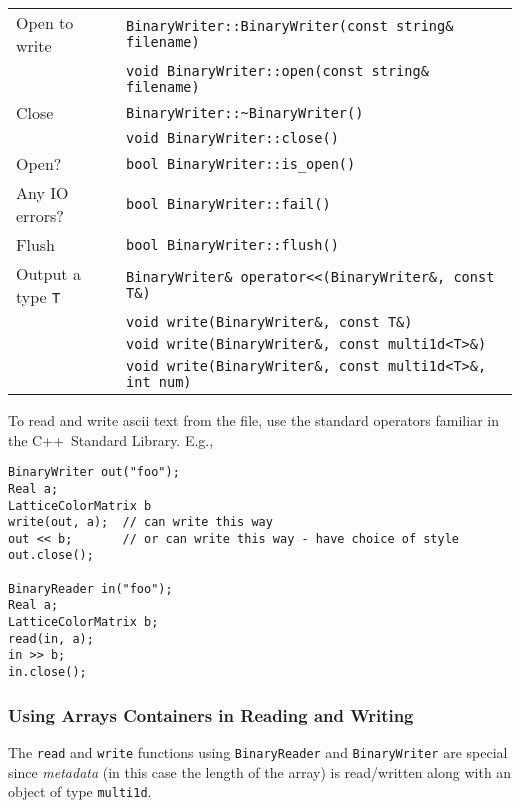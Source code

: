 \documentclass[12pt,letterpaper]{article}
\newcommand{\cpp}{C++}
\begin{document}
\begin{flushleft}
  \begin{tabular}{|l|l|}
  \hline
  Open to write  & \verb|BinaryWriter::BinaryWriter(const string& filename)|\\
                 & \verb|void BinaryWriter::open(const string& filename)|\\
  \hline
  Close          & \verb|BinaryWriter::~BinaryWriter()|\\
                 & \verb|void BinaryWriter::close()|\\
  \hline
  Open?          & \verb|bool BinaryWriter::is_open()| \\
  \hline
  Any IO errors? & \verb|bool BinaryWriter::fail()| \\
  \hline
  Flush          & \verb|bool BinaryWriter::flush()| \\
  \hline
  Output a type \verb|T| & \verb|BinaryWriter& operator<<(BinaryWriter&, const T&)| \\
                 & \verb|void write(BinaryWriter&, const T&)| \\
                 & \verb|void write(BinaryWriter&, const multi1d<T>&)| \\
                 & \verb|void write(BinaryWriter&, const multi1d<T>&, int num)| \\
  \hline
 \end{tabular}
\end{flushleft}
%
To read and write ascii text from the file, use the standard operators
familiar in the \cpp\ Standard Library. E.g.,
%
\begin{small}
\begin{verbatim}
BinaryWriter out("foo");
Real a;
LatticeColorMatrix b
write(out, a);  // can write this way
out << b;       // or can write this way - have choice of style
out.close();

BinaryReader in("foo");
Real a;
LatticeColorMatrix b;
read(in, a);
in >> b;
in.close();
\end{verbatim}
\end{small}

\subsubsection{Using Arrays Containers in Reading and Writing}

The \verb|read| and \verb|write| functions using \verb|BinaryReader|
and \verb|BinaryWriter| are special since {\em metadata} (in this case
the length of the array) is read/written along with an object of type
\verb|multi1d|. 
\end{document}
